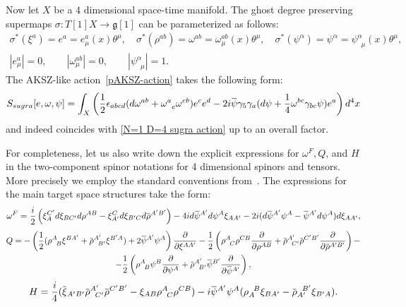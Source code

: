 \documentclass[a4paper,12pt]{article}
\numberwithin{equation}{section} %
\newcommand{\p}[1]{|#1|}
\newcommand{\Liealg}{\mathfrak}
\newcommand{\algg}{\Liealg{g}}
\numberwithin{equation}{section}
\newcommand{\overbar}[1]{\mkern 1.5mu\overline{\mkern-1.5mu#1\mkern-1.5mu}\mkern 1.5mu}
\renewcommand{\wedge}{}
\newcommand{\psibar}{\overbar{\psi}}
\newcommand{\rhobar}{\overbar{\rho}}
\newcommand{\xibar}{\overbar{\xi}}
\newcommand{\atheta}{\theta}
\newcommand{\alphadot}{{A^\prime}}
\newcommand{\betadot}{{B^\prime}}
\newcommand{\gammadot}{{C^\prime}}
\newcommand{\B}{{B}}
\newcommand{\C}{{C}}
\begin{document}
Now let $X$ be a 4 dimensional space-time manifold. The ghost degree preserving supermaps $\sigma: T[1]X \to \algg[1]$ can be parameterized as follows:
\begin{equation}\label{Sugra map space}
    \begin{gathered}
    \sigma^\ast(\xi^a) = e^a = e^a_\mu (x)\atheta^\mu, \quad \sigma^\ast(\rho^{ab}) = \omega^{ab} = \omega^{ab}_\mu(x) \atheta^\mu, \quad \sigma^\ast(\psi^\alpha) = \psi^\alpha = \psi^\alpha_{\enspace \mu}(x)\atheta^\mu,\\
    \p{e^a_\mu} = 0, \qquad \p{\omega^{ab}_\mu} = 0, \qquad \p{\psi^\alpha_{\enspace \mu}} =1.
\end{gathered}
\end{equation}
The AKSZ-like action~\eqref{pAKSZ-action} takes the following form:
\begin{equation}
    S_{sugra}[e,\omega,\psi] = \int_X\left( \frac{1}{2} \epsilon_{abcd} (d\omega^{ab} + \omega^a_{\enspace e} \wedge \omega^{eb})\wedge e^c \wedge e^d - 2i \overbar{\psi} \wedge \gamma_5 \gamma_a (d\psi + \frac{1}{4}\omega^{bc}\gamma_{bc}\wedge \psi) \wedge e^a\right) d^4x
\end{equation}
and indeed coincides with \eqref{N=1 D=4 sugra action} up to an overall factor.

For completeness, let us also write down the explicit expressions for $\omega^F, Q$, and $H$ in the two-component spinor notations for 4 dimensional spinors and tensors.  More precisely we employ the standard conventions from~\cite{penrose1984spinors,huggett1994introduction}. The expressions for    
the main target space structures take the form:
\begin{equation}\label{SUGRA presymplectic structure}
   \omega^F = \frac{i}{2}\left(\xi_A^\gammadot d\xi_{ \B\gammadot}d\rho^{A \B} - \xi_\alphadot^\C d\xi_{\betadot\C}d\rhobar^{\alphadot\betadot}\right)- 4id\psibar^\alphadot d\psi^A \xi_{A\alphadot} -2i (d\psibar^\alphadot \psi^{A} - \psibar^\alphadot d\psi^A) d\xi_{A\alphadot},
\end{equation}
\begin{multline}\label{Q-2c-spinors}
 Q = -\left(\frac{1}{2}(\rho^{A}_{\enspace \B}\xi^{ \B\alphadot} + \rhobar^\alphadot_{\enspace\betadot}\xi^{\betadot A})+2\psibar^\alphadot\psi^A\right)\frac{\partial}{\partial \xi^{A\alphadot}} -\frac{1}{2} \left(\rho^A_{\enspace\C}\rho^{\C \B}\frac{\partial}{\partial \rho^{A \B}} +\rhobar^\alphadot_{\enspace\gammadot}\rhobar^{\gammadot\betadot}\frac{\partial}{\partial \rhobar^{\alphadot\betadot}}\right) - \\
    -\frac{1}{2}\left(\rho^A_{\enspace \B}\psi^ \B \frac{\partial}{\partial \psi^A}  + \rhobar^\alphadot_{\enspace\betadot}\psibar^\betadot\frac{\partial}{\partial \psibar^\alphadot}\right),
\end{multline}
\begin{equation}
    H = \frac{i}{4}(\xibar_{\alphadot\betadot} \rhobar^{\alphadot}_{\enspace\gammadot} \rhobar^{\gammadot\betadot}-\xi_{A \B}\rho^{A}_{\enspace\C} \rho^{\C \B}) -i \psibar^\alphadot\psi^A(\rho_{A}^{\enspace \B}\xi_{\B\alphadot} - \rhobar_{\alphadot}^{\enspace\betadot}\xi_{\betadot A}).
\end{equation}
\end{document}
